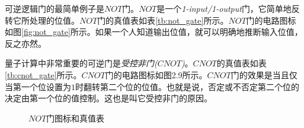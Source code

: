 可逆逻辑门的最简单例子是$NOT$门。$NOT$是一个\emph{1-input/1-output}门，它简单地反转它所处理的位值。$NOT$门的真值表如表\ref{tb:not_gate}所示。$NOT$门的电路图标如图\ref{fig:not_gate}所示。如果一个人知道输出位值，就可以明确地推断输入位值，反之亦然。

量子计算中非常重要的可逆门是\emph{受控非门($CNOT$)}。$CNOT$的真值表如表\ref{tb:cnot_gate}所示。$CNOT$门的电路图标如图2.9所示。$CNOT$门的效果是当且仅当第一个位设置为$1$时翻转第二个位的位值。也就是说，否定或不否定第二个位的决定由第一个位的值控制。这也是叫它受控非门的原因。
\begin{figure}
    \centering
    \caption[$NOT$门图标和真值表]{$NOT$门图标和真值表}
\end{figure}



